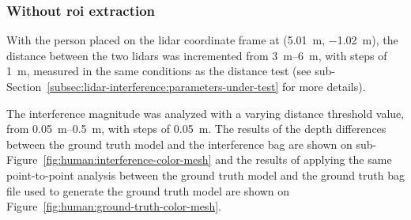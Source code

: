 \subsubsection{Without \ac{roi} extraction}
With the person placed on the \ac{lidar} coordinate frame at (\SI{5.01}{\meter}, \SI{-1.02}{\meter}), the distance between the two \acp{lidar} was incremented from \SIrange{3}{6}{\meter}, with steps of \SI{1}{\meter}, measured in the same conditions as the distance test (see sub-Section~\ref{subsec:lidar-interference:parameters-under-test} for more details). 

The interference magnitude was analyzed with a varying distance threshold value, from \SIrange{0.05}{0.5}{\meter}, with steps of \SI{0.05}{\meter}. The results of the depth differences between the ground truth model and the interference bag are shown on sub-Figure~\ref{fig:human:interference-color-mesh} and the results of applying the same point-to-point analysis between the ground truth model and the ground truth bag file used to generate the ground truth model are shown on Figure~\ref{fig:human:ground-truth-color-mesh}.

